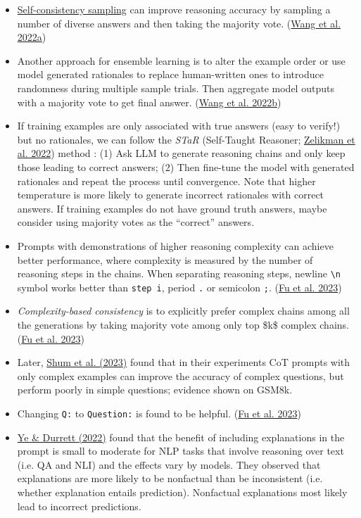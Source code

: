 \begin{itemize}
\item
  \hyperref[self-consistency-sampling]{Self-consistency sampling} can improve reasoning accuracy by sampling a number of diverse answers and then taking the majority vote. (\href{https://arxiv.org/abs/2203.11171}{Wang et al. 2022a})
\item
  Another approach for ensemble learning is to alter the example order or use model generated rationales to replace human-written ones to introduce randomness during multiple sample trials. Then aggregate model outputs with a majority vote to get final answer. (\href{https://arxiv.org/abs/2207.00747}{Wang et al. 2022b})
\item
  If training examples are only associated with true answers (easy to verify!) but no rationales, we can follow the \emph{STaR} (Self-Taught Reasoner; \href{https://arxiv.org/abs/2203.14465}{Zelikman et al. 2022}) method : (1) Ask LLM to generate reasoning chains and only keep those leading to correct answers; (2) Then fine-tune the model with generated rationales and repeat the process until convergence. Note that higher temperature is more likely to generate incorrect rationales with correct answers. If training examples do not have ground truth answers, maybe consider using majority votes as the ``correct'' answers.
\item
  Prompts with demonstrations of higher reasoning complexity can achieve better performance, where complexity is measured by the number of reasoning steps in the chains. When separating reasoning steps, newline \texttt{\textbackslash{}n} symbol works better than \texttt{step\ i}, period \texttt{.} or semicolon \texttt{;}. (\href{https://arxiv.org/abs/2210.00720}{Fu et al. 2023})
\item
  \emph{Complexity-based consistency} is to explicitly prefer complex chains among all the generations by taking majority vote among only top \$k\$ complex chains. (\href{https://arxiv.org/abs/2210.00720}{Fu et al. 2023})
\item
  Later, \href{https://arxiv.org/abs/2302.12822}{Shum et al. (2023)} found that in their experiments CoT prompts with only complex examples can improve the accuracy of complex questions, but perform poorly in simple questions; evidence shown on GSM8k.
\item
  Changing \texttt{Q:} to \texttt{Question:} is found to be helpful. (\href{https://arxiv.org/abs/2210.00720}{Fu et al. 2023})
\item
  \href{https://arxiv.org/abs/2205.03401}{Ye \& Durrett (2022)} found that the benefit of including explanations in the prompt is small to moderate for NLP tasks that involve reasoning over text (i.e. QA and NLI) and the effects vary by models. They observed that explanations are more likely to be nonfactual than be inconsistent (i.e. whether explanation entails prediction). Nonfactual explanations most likely lead to incorrect predictions.

\end{itemize}
